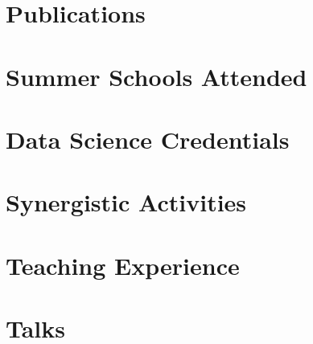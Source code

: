 \documentclass[margin,line]{resume}
\begin{document}
\begin{resume}
    \section{\mysidestyle Publications}

    
    
    \section{\mysidestyle Summer Schools Attended}

    

    \section{\mysidestyle Data Science Credentials}

    

    \newpage

    \section{\mysidestyle Synergistic Activities}

    

    \section{\mysidestyle Teaching Experience}
    
    
    \section{\mysidestyle Talks}



\end{resume}
\end{document}
